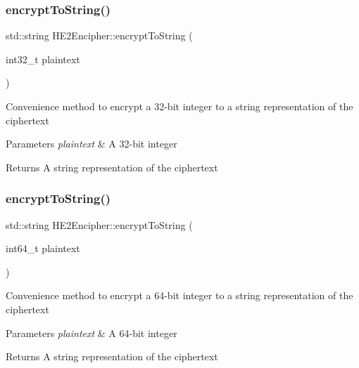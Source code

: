 \subsubsection{\texorpdfstring{encrypt\+To\+String()}{encryptToString()}\hspace{0.1cm}{\footnotesize\ttfamily [2/4]}}
{\footnotesize\ttfamily std\+::string H\+E2\+Encipher\+::encrypt\+To\+String (\begin{DoxyParamCaption}\item[{int32\+\_\+t}]{plaintext }\end{DoxyParamCaption})\hspace{0.3cm}{\ttfamily [virtual]}}

Convenience method to encrypt a 32-\/bit integer to a string representation of the ciphertext 
\begin{DoxyParams}{Parameters}
{\em plaintext} & A 32-\/bit integer \\
\hline
\end{DoxyParams}
\begin{DoxyReturn}{Returns}
A string representation of the ciphertext 
\end{DoxyReturn}
\mbox{\label{classHE2Encipher_a3c4dfca45e9f65955e64a328910b1339}} 
\subsubsection{\texorpdfstring{encrypt\+To\+String()}{encryptToString()}\hspace{0.1cm}{\footnotesize\ttfamily [3/4]}}
{\footnotesize\ttfamily std\+::string H\+E2\+Encipher\+::encrypt\+To\+String (\begin{DoxyParamCaption}\item[{int64\+\_\+t}]{plaintext }\end{DoxyParamCaption})\hspace{0.3cm}{\ttfamily [virtual]}}

Convenience method to encrypt a 64-\/bit integer to a string representation of the ciphertext 
\begin{DoxyParams}{Parameters}
{\em plaintext} & A 64-\/bit integer \\
\hline
\end{DoxyParams}
\begin{DoxyReturn}{Returns}
A string representation of the ciphertext 
\end{DoxyReturn}
\mbox{\label{classHE2Encipher_a2b0d3c50f377d3cabe1a102f55ae2b48}} 

